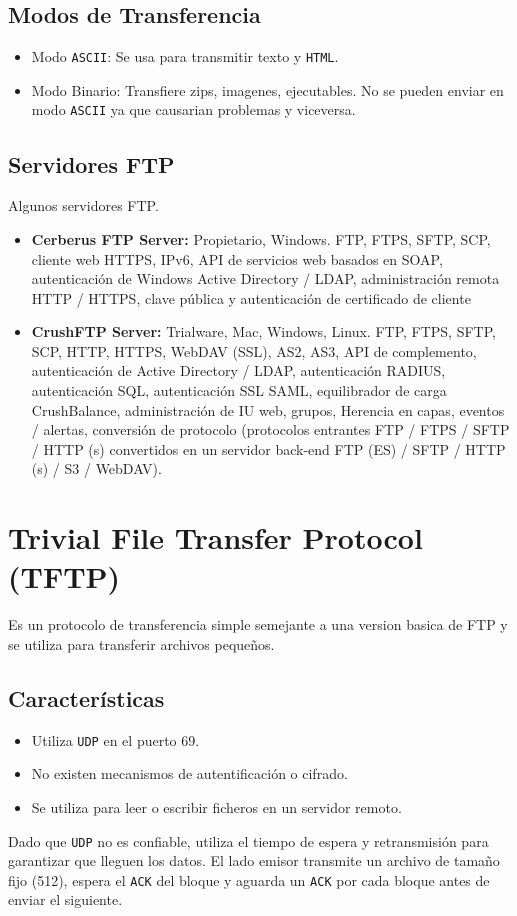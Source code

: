  \subsection*{Modos de Transferencia}
\begin{itemize}
\item Modo \texttt{ASCII}: Se usa para transmitir texto y \texttt{HTML}.
\item Modo Binario: Transfiere zips, imagenes, ejecutables. No se pueden enviar en modo \texttt{ASCII} ya que causarian problemas y viceversa.
\end{itemize}
\subsection*{Servidores FTP}
Algunos servidores FTP.
\begin{itemize}
\item \textbf{Cerberus FTP Server:} Propietario, Windows. FTP, FTPS, SFTP, SCP, cliente web HTTPS, IPv6, API de servicios web basados en SOAP, autenticación de Windows Active Directory / LDAP, administración remota HTTP / HTTPS, clave pública y autenticación de certificado de cliente
\item \textbf{CrushFTP Server:} Trialware, Mac, Windows, Linux. FTP, FTPS, SFTP, SCP, HTTP, HTTPS, WebDAV (SSL), AS2, AS3, API de complemento, autenticación de Active Directory / LDAP, autenticación RADIUS, autenticación SQL, autenticación SSL SAML, equilibrador de carga CrushBalance, administración de IU web, grupos, Herencia en capas, eventos / alertas, conversión de protocolo (protocolos entrantes FTP / FTPS / SFTP / HTTP (s) convertidos en un servidor back-end FTP (ES) / SFTP / HTTP (s) / S3 / WebDAV).
\end{itemize}
 \section*{Trivial File Transfer Protocol (TFTP)}
 Es un protocolo de transferencia simple semejante a una version basica de FTP y se utiliza para transferir archivos pequeños.
\subsection*{Características}
\begin{itemize}
\item Utiliza \texttt{UDP} en el puerto 69.
\item No existen mecanismos de autentificación o cifrado.
\item Se utiliza para leer o escribir ficheros en un servidor remoto.
\end{itemize}
Dado que \texttt{UDP} no es confiable, utiliza el tiempo de espera y retransmisión para garantizar que lleguen los datos. El lado emisor transmite un archivo de tamaño fijo (512), espera el \texttt{ACK} del bloque y aguarda un \texttt{ACK} por cada bloque antes de enviar el siguiente.
